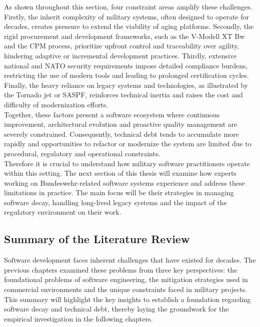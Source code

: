 As shown throughout this section, four constraint areas amplify these challenges. Firstly, the inherit complexity of military systems, often designed to operate for decades, creates pressure to extend the viability of aging platforms.
Secondly, the rigid procurement and development frameworks, such as the V-Modell XT Bw and the \ac{CPM} process, prioritize upfront control and traceability over agility, hindering adaptive or incremental development practices.
Thirdly, extensive national and NATO security requirements impose detailed compliance burdens, restricting the use of modern tools and leading to prolonged certification cycles. Finally, the heavy reliance on legacy systems and technologies, as illustrated by the Tornado jet or SASPF, 
reinforces technical inertia and raises the cost and difficulty of modernization efforts.\\

Together, these factors present a software ecosystem where continuous improvement, architectural evolution and proactive quality management are severely constrained. Consequently, technical debt tends to accumulate more rapidly and opportunities to refactor or modernize the system are limited due to
procedural, regulatory and operational constraints.\\

Therefore it is crucial to understand how military software practitioners operate within this setting. The next section of this thesis will examine how experts working on Bundeswehr-related software systems experience and address these limitations in practice.
The main focus will be their strategies in managing software decay, handling long-lived legacy systems and the impact of the regulatory environment on their work.

\subsection{Summary of the Literature Review}
Software development faces inherent challenges that have existed for decades. The previous chapters examined these problems from three key perspectives: the foundational problems of software engineering, the mitigation strategies used in commercial environments and the unique constraints faced in military projects.
This summary will highlight the key insights to establish a foundation regarding software decay and technical debt, thereby laying the groundwork for the empirical investigation in the following chapters.\\

